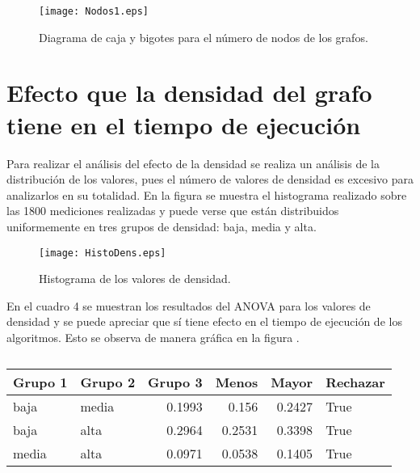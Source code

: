 \documentclass{article}
\begin{document}
\begin{figure}
\begin{center}
  \texttt{[image: Nodos1.eps]}
\end{center}
\vspace*{-8mm}
\caption{Diagrama de caja y bigotes para el número de nodos de los grafos.}
  \label{Figura 4} 
\end{figure}

\section*{Efecto que la densidad del grafo tiene en el tiempo de ejecución}

Para realizar el análisis del efecto de la densidad se realiza un análisis de la distribución de los valores, pues el número de valores de densidad es excesivo para analizarlos en su totalidad. En la figura \pageref{Figura 5} se muestra el histograma realizado sobre las 1800 mediciones realizadas y puede verse que están distribuidos uniformemente en tres grupos de densidad: baja, media y alta.

\begin{figure}
\begin{center}
  \texttt{[image: HistoDens.eps]}
\end{center}
\vspace*{-8mm}
\caption{Histograma de los valores de densidad.}
  \label{Figura 5} 
\end{figure}

En el cuadro 4 se muestran los resultados del ANOVA para los valores de densidad y se puede apreciar que sí tiene efecto en el tiempo de ejecución de los algoritmos. Esto se observa de manera gráfica en la figura \pageref{Figura 6}.

\begin{table}[htbp]
  \centering
  \caption{}
    \begin{tabular}{|l|l|r|r|r|l|}
    \toprule
    \rowcolor[rgb]{ .357,  .608,  .835} \textbf{Grupo 1} & \textbf{Grupo 2} & \multicolumn{1}{l|}{\textbf{Grupo 3}} & \multicolumn{1}{l|}{\textbf{Menos}} & \multicolumn{1}{l|}{\textbf{Mayor}} & \textbf{Rechazar} \\
    \midrule
    baja  & media & 0.1993 & 0.156 & 0.2427 & True \\
    \midrule
    baja  & alta  & 0.2964 & 0.2531 & 0.3398 & True \\
    \midrule
    media & alta  & 0.0971 & 0.0538 & 0.1405 & True \\
    \bottomrule
    \end{tabular}%
  \label{tab:Cuadro 4}%
\end{table}%
\end{document}

